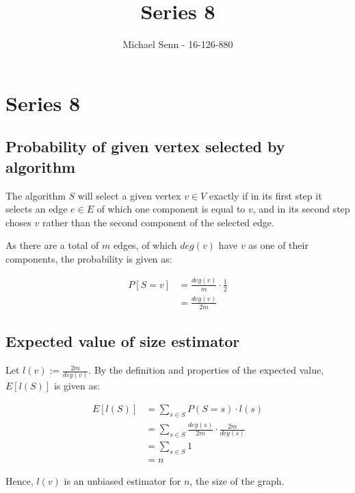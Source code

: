 \documentclass[a4paper]{scrreprt}
\title{Series 8}
\author{Michael Senn \maillink{michael.senn@students.unibe.ch} - 16-126-880}
\date{\printdate}
\begin{document}
\maketitle


\setcounter{chapter}{7}
\chapter{Series 8}

\section{Probability of given vertex selected by algorithm}

The algorithm $S$ will select a given vertex $v \in V$ exactly if in its first
step it selects an edge $e \in E$ of which one component is equal to $v$, and
in its second step choses $v$ rather than the second component of the selected
edge.

As there are a total of $m$ edges, of which $deg(v)$ have $v$ as one of their 
components, the probability is given as:

\begin{align*}
	P[S = v] & = \frac{deg(v)}{m} \cdot \frac{1}{2} \\
		 & = \frac{deg(v)}{2m}
\end{align*}

\section{Expected value of size estimator}

Let $l(v) := \frac{2m}{deg(v)}$. By the definition and properties of the
expected value, $E[l(S)]$ is given as:

\begin{align*}
	E[l(S)] & = \sum_{s \in S}{P(S = s) \cdot l(s)} \\
		& = \sum_{s \in S}{\frac{deg(s)}{2m} \cdot \frac{2m}{deg(s)}} \\
		& = \sum_{s \in S}{1} \\
		& = n
\end{align*}

Hence, $l(v)$ is an unbiased estimator for $n$, the size of the graph.
\end{document}
